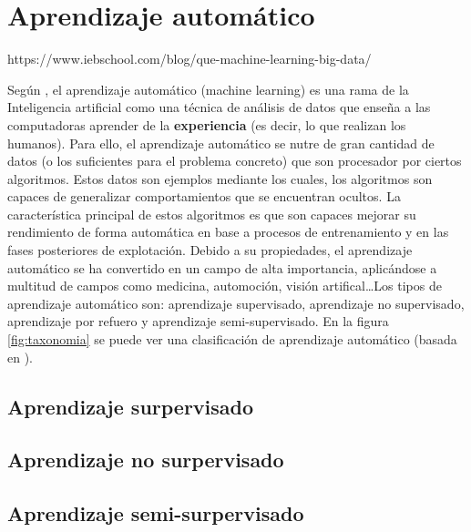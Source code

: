 

\section{Aprendizaje automático}

https://www.iebschool.com/blog/que-machine-learning-big-data/

Según \cite{intelligent:ml}, el aprendizaje automático (machine learning) es una
rama de la Inteligencia artificial como una técnica de análisis de datos que
enseña a las computadoras aprender de la \textbf{experiencia} (es decir, lo que
realizan los humanos). Para ello, el aprendizaje automático se nutre de gran
cantidad de datos (o los suficientes para el problema concreto) que son
procesador por ciertos algoritmos. Estos datos son ejemplos \cite{pascual:ml}
mediante los cuales, los algoritmos son capaces de generalizar comportamientos
que se encuentran ocultos. La característica principal de estos algoritmos es
que son capaces mejorar su rendimiento de forma automática en base a procesos de
entrenamiento y en las fases posteriores de explotación. Debido a su
propiedades, el aprendizaje automático se ha convertido en un campo de alta
importancia, aplicándose a multitud de campos como medicina, automoción, visión
artifical\ldots Los tipos de aprendizaje automático son: aprendizaje
supervisado, aprendizaje no supervisado, aprendizaje por refuero y aprendizaje
semi-supervisado. En la figura \ref{fig:taxonomia} se puede ver una
clasificación de aprendizaje automático (basada en \cite{neova:taxonomy}).


\subsection{Aprendizaje surpervisado}


\subsection{Aprendizaje no surpervisado}

\subsection{Aprendizaje semi-surpervisado}

